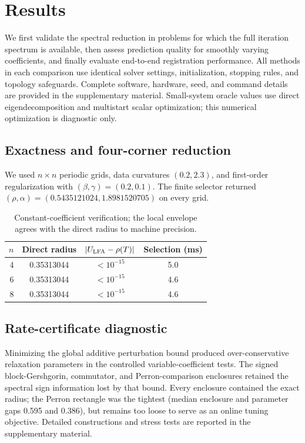 \documentclass[pdflatex,iicol,sn-mathphys-num]{sn-jnl}
\theoremstyle{definition}\newtheorem{definition}[theorem]{Definition}\newtheorem{remark}[theorem]{Remark}
\begin{document}
\section{Results}
We first validate the spectral reduction in problems for which the full
iteration spectrum is available, then assess prediction quality for smoothly
varying coefficients, and finally evaluate end-to-end registration performance.
All methods in each comparison use identical solver settings, initialization,
stopping rules, and topology safeguards. Complete software, hardware, seed,
and command details are provided in the supplementary material. Small-system
oracle values use direct eigendecomposition and multistart scalar optimization;
this numerical optimization is diagnostic only.

\subsection{Exactness and four-corner reduction}
We used $n\times n$ periodic grids, data curvatures $(0.2,2.3)$, and first-order regularization with $(\beta,\gamma)=(0.2,0.1)$.  The finite selector returned $(\rho,\alpha)=(0.5435121024,1.8981520705)$ on every grid.

\begin{table}[ht]
\centering
\caption{Constant-coefficient verification; the local envelope agrees with the direct radius to machine precision.}
\begin{tabular}{rccc}
\toprule
$n$ & Direct radius & $|U_{\rm LFA}-\rho(T)|$ & Selection (ms)\\
\midrule
4 & 0.35313044 & $<10^{-15}$ & 5.0\\
6 & 0.35313044 & $<10^{-15}$ & 4.6\\
8 & 0.35313044 & $<10^{-15}$ & 4.6\\
\bottomrule
\end{tabular}
\end{table}

\subsection{Rate-certificate diagnostic}
Minimizing the global additive perturbation bound produced over-conservative
relaxation parameters in the controlled variable-coefficient tests. The signed
block-Gershgorin, commutator, and Perron-comparison enclosures retained the
spectral sign information lost by that bound. Every enclosure contained the
exact radius; the Perron rectangle was the tightest (median enclosure and
parameter gaps 0.595 and 0.386), but remains too loose to serve as an online
tuning objective. Detailed constructions and stress tests are reported in the
supplementary material.
\end{document}

